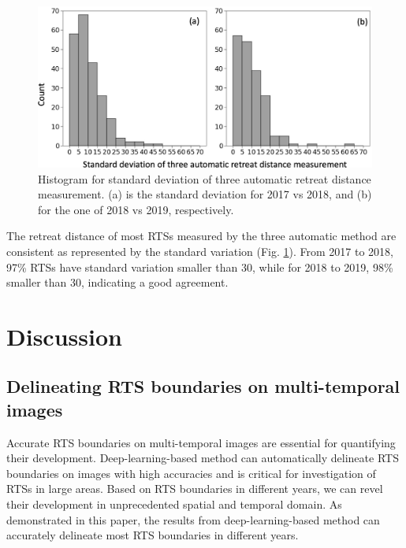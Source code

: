 \documentclass[authoryear,preprint,review,12pt]{elsarticle}
\begin{document}
\begin{figure} 
	\centering
	\includegraphics[width=14cm]{figs/standard_deviation_trim.jpg}
	\caption{Histogram for standard deviation of three automatic retreat distance measurement. (a) is the standard deviation for 2017 vs 2018, and (b) for the one of 2018 vs 2019, respectively.}
	\label{fig_re_dis_standard_var}
\end{figure}

The retreat distance of most RTSs measured by the three automatic method are consistent as represented by the standard variation (Fig. \ref{fig_re_dis_standard_var}).
From 2017 to 2018, 97\% RTSs have standard variation smaller than 30, while for 2018 to 2019, 98\% smaller than 30, indicating a good agreement. 

 

 

\section{Discussion}
\label{sec_discussion}

\subsection{Delineating RTS boundaries on multi-temporal images}
\label{sec_diss_mapping_rts_multi_images}

Accurate RTS boundaries on multi-temporal images are essential for quantifying their development.
Deep-learning-based method can automatically delineate RTS boundaries on images with high accuracies and is critical for investigation of RTSs in large areas. 
Based on RTS boundaries in different years, we can revel their development in unprecedented spatial and temporal domain. 
As demonstrated in this paper, the results from deep-learning-based method can accurately delineate most RTS boundaries in different years. %
\end{document}
